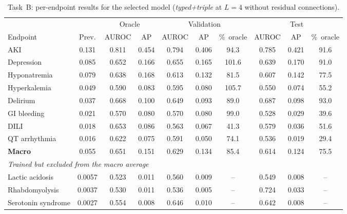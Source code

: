     \begin{table}[H]
      \centering
      \small
      \setlength{\tabcolsep}{4pt}
      \caption{Task~B: per-endpoint results for the selected model
        (\emph{typed+triple} at $L=4$ without residual connections).}
      \label{tab:per-endpoint}
      \begin{tabular}{lccc ccc ccc}
        \toprule
        & & \multicolumn{2}{c}{Oracle} & \multicolumn{3}{c}{Validation} & \multicolumn{3}{c}{Test} \\
        \cmidrule(lr){3-4}\cmidrule(lr){5-7}\cmidrule(lr){8-10}
        Endpoint & Prev. & AUROC & AP & AUROC & AP & \%~oracle & AUROC & AP & \%~oracle \\
        \midrule
        AKI                & 0.131 & 0.811 & 0.454 & 0.794 & 0.406 & 94.3  & 0.785 & 0.421 & 91.6 \\
        Depression         & 0.085 & 0.652 & 0.166 & 0.655 & 0.165 & 101.6 & 0.639 & 0.170 & 91.0 \\
        Hyponatremia       & 0.079 & 0.638 & 0.168 & 0.613 & 0.132 & 81.5  & 0.607 & 0.142 & 77.5 \\
        Hyperkalemia       & 0.049 & 0.590 & 0.083 & 0.595 & 0.080 & 105.7 & 0.550 & 0.074 & 55.2 \\
        Delirium           & 0.037 & 0.668 & 0.100 & 0.649 & 0.093 & 89.0  & 0.687 & 0.098 & 93.0 \\
        GI bleeding        & 0.021 & 0.570 & 0.080 & 0.570 & 0.080 & 99.0  & 0.528 & 0.029 & 39.6 \\
        DILI               & 0.018 & 0.653 & 0.086 & 0.563 & 0.067 & 41.3  & 0.579 & 0.036 & 51.6 \\
        QT arrhythmia      & 0.016 & 0.622 & 0.075 & 0.591 & 0.050 & 74.1  & 0.536 & 0.019 & 29.4 \\
        \midrule
        \textbf{Macro}     & 0.055 & 0.651 & 0.151 & 0.629 & 0.134 & 85.4  & 0.614 & 0.124 & 75.5 \\
        \midrule
        \multicolumn{10}{l}{\emph{Trained but excluded from the macro average}} \\
        Lactic acidosis    & 0.0057 & 0.523 & 0.011 & 0.560 & 0.009 & {--} & 0.549 & 0.008 & {--} \\
        Rhabdomyolysis     & 0.0037 & 0.530 & 0.011 & 0.536 & 0.005 & {--} & 0.724 & 0.033 & {--} \\
        Serotonin syndrome & 0.0027 & 0.554 & 0.008 & 0.646 & 0.010 & {--} & 0.642 & 0.008 & {--} \\
        \bottomrule
      \end{tabular}
    \end{table}
